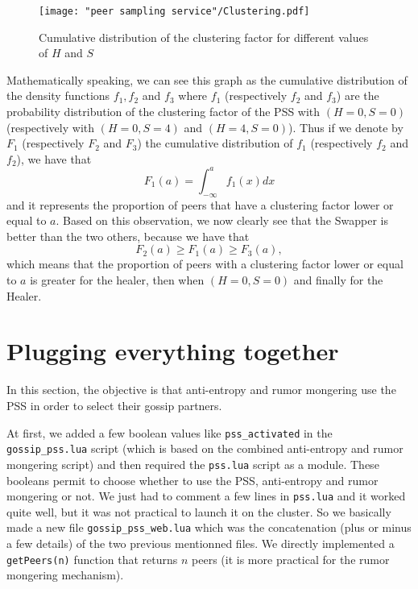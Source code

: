 \documentclass[a4paper, 11pt]{article}
\theoremstyle{plain}
\theoremstyle{definition}
\begin{document}
\begin{enumerate}
    \begin{figure}[h]
      \centering
      \texttt{[image: "peer sampling service"/Clustering.pdf]}
      \caption{Cumulative distribution of the clustering factor for different values of $H$ and $S$}
      \label{fig:clustering}
    \end{figure}

    Mathematically speaking, we can see this graph as the cumulative distribution of the density functions
    $f_1, f_2$ and $f_3$ where $f_1$ (respectively $f_2$ and $f_3$) are the probability distribution of the
    clustering factor of the PSS with $(H=0, S=0)$ (respectively with $(H=0, S=4)$ and $(H=4, S=0)$). Thus if
    we denote by $F_1$ (respectively $F_2$ and $F_3$) the cumulative distribution of $f_1$ (respectively $f_2$
    and $f_2$), we have that 
      \[F_1(a) = \int_{-\infty}^a f_1(x) dx\]
    and it represents the proportion of peers that have a clustering factor lower or equal to $a$. Based on
    this observation, we now clearly see that the Swapper is better than the two others, because we have that
      \[F_2(a) \geq F_1(a) \geq F_3(a),\]
    which means that the proportion of peers with a clustering factor lower or equal to $a$ is greater for the
    healer, then when $(H=0, S=0)$ and finally for the Healer.
  \end{enumerate}

  


\section{Plugging everything together}
\label{sec:plugg-everyth-togeth}

  In this section, the objective is that anti-entropy and rumor mongering use the PSS in order to select
  their gossip partners.

  At first, we added a few boolean values like \texttt{pss\_activated} in the \texttt{gossip\_pss.lua} script
  (which is based on the combined anti-entropy and rumor mongering script) and then required the
  \texttt{pss.lua} script as a module. These booleans permit to choose whether to use the PSS, anti-entropy
  and rumor mongering or not. We just had to comment a few lines in \texttt{pss.lua} and it worked
  quite well, but it was not practical to launch it on the cluster. So we basically made a new file
  \texttt{gossip\_pss\_web.lua} which was the concatenation (plus or minus a few details) of the two previous mentionned
  files. We directly implemented a \texttt{getPeers(n)} function that returns $n$ peers (it is more practical
  for the rumor mongering mechanism).
\end{document}
